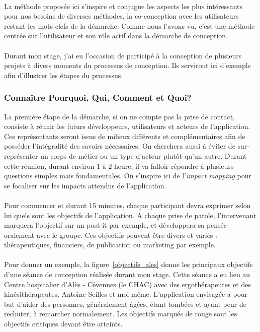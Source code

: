 \paragraph{} La méthode proposée ici s'inspire et conjugue les aspects les plus intéressants pour nos besoins de diverses  méthodes, la co-conception avec les utilisateurs restant les mots clefs de la démarche. Comme nous l'avons vu, c'est une méthode centrée sur l'utilisateur et son rôle actif dans la démarche de conception.

\paragraph{} Durant mon stage, j'ai eu l'occasion de participé à la conception de plusieurs projets à divers moments du processus de conception. Ils serviront ici d'exemple afin d'illustrer les étapes du processus.

	\subsubsection*{Connaître Pourquoi, Qui, Comment et Quoi?}
La première étape de la démarche, si on ne compte pas la prise de contact, consiste à réunir les futurs développeurs, utilisateurs et acteurs de l'application. Ces représentants seront issus de milieux différents et complémentaires afin de posséder l'intégralité des savoirs nécessaires. On cherchera aussi à éviter de sur-représenter un corps de métier ou un type d'acteur plutôt qu'un autre. Durant cette réunion, durant environ 1 à 2 heure, il va falloir répondre à plusieurs questions simples mais fondamentales. On s'inspire ici de l'\emph{impact mapping} pour se focaliser sur les impacts attendus de l'application.

\paragraph{}Pour commencer et durant 15 minutes, chaque participant devra exprimer selon lui quels sont les objectifs de l'application. A chaque prise de parole, l'intervenant marquera l'objectif sur un post-it par exemple, et développera sa pensée oralement avec le groupe. Ces objectifs peuvent être divers et variés : thérapeutiques, financiers, de publication ou marketing par exemple. 

\paragraph{} Pour donner un exemple, la figure~\ref{objectifs_ales} donne les principaux objectifs d'une séance de conception réalisée durant mon stage. Cette séance a eu lieu au Centre hospitalier d'Alès - Cévennes (le CHAC) avec des ergothérapeutes et des kinésithérapeutes, Antoine Seilles et moi-même. L'application envisagée a pour but d'aider des personnes, généralement âgées, étant tombées et ayant peur de rechuter, à remarcher normalement. Les objectifs marqués de rouge sont les objectifs critiques devant être atteints.

